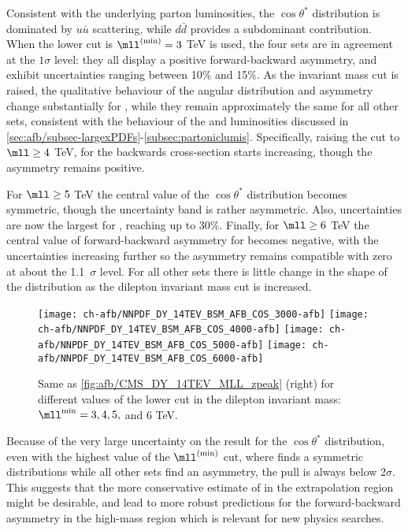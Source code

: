  Consistent with the underlying parton luminosities, the $\cos\theta^*$ distribution
 is dominated by $u\bar{u}$ scattering, while  $d\bar{d}$ provides
 a subdominant contribution.
 When the lower cut  is $\mll^{(\rm min)}=3$ TeV is used, the four \pdf
 sets are in agreement at the $1\sigma$ level: they all
 display a 
 positive forward-backward asymmetry, and exhibit \pdf uncertainties ranging between 10\% and 15\%.
 As the invariant mass cut is raised, the qualitative behaviour of the
 angular distribution and
 asymmetry change substantially for , while they remain
 approximately the same for all other \pdf sets, consistent with the
 behaviour of the \pdfs and luminosities discussed in
 \cref{sec:afb/subsec-largexPDFs}-\ref{subsec:partoniclumis}.
%
 Specifically,
 raising the cut to
 $\mll \ge 4$ TeV, for 
 the backwards cross-section starts increasing, though the asymmetry remains
positive.

For $\mll\ge 5$ TeV the central value of the  $\cos\theta^*$
 distribution  becomes symmetric, though the  \pdf uncertainty band is
 rather asymmetric. Also, \pdf uncertainties
 are now the largest for , reaching up to 30\%.
 Finally, for $\mll\ge 6$ TeV  the central value of 
 forward-backward asymmetry for  becomes negative, with the
 \pdf uncertainties increasing further so the asymmetry remains compatible
 with zero at about the 1.1~$\sigma$ level.
 For all other \pdf sets there is little change in the shape of the distribution as the
 dilepton invariant mass cut is increased.

\begin{figure}[t!]
 \centering
 \texttt{[image: ch-afb/NNPDF\_DY\_14TEV\_BSM\_AFB\_COS\_3000-afb]}
 \texttt{[image: ch-afb/NNPDF\_DY\_14TEV\_BSM\_AFB\_COS\_4000-afb]}
 \texttt{[image: ch-afb/NNPDF\_DY\_14TEV\_BSM\_AFB\_COS\_5000-afb]}
 \texttt{[image: ch-afb/NNPDF\_DY\_14TEV\_BSM\_AFB\_COS\_6000-afb]}
 \caption{Same as \cref{fig:afb/CMS_DY_14TEV_MLL_zpeak} (right)
   for different values of the  lower cut in the dilepton
   invariant mass: $\mll^{\text{min}}=3, 4,5,$ and 6 TeV.
  }    
 \label{fig:afb/CMS_DY_14TEV_MLL_others_asy}
\end{figure}

Because of the very large uncertainty on the  result for the $\cos\theta^*$
distribution, even with
the highest value of the  $\mll^{(\rm  min)}$ cut, where  finds a
symmetric distributions while all other \pdf sets find an asymmetry,
the pull is always below $2 \sigma$.
%
This suggests that the more
conservative estimate of   in the extrapolation region might be
desirable, and lead to more robust predictions for the
forward-backward asymmetry in the high-mass region which is relevant
for new physics searches.
